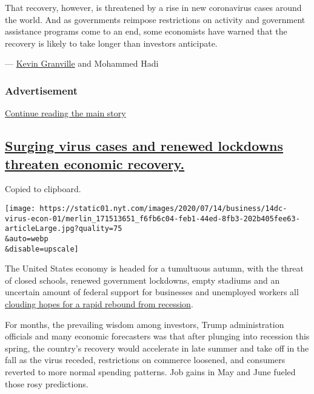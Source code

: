 That recovery, however, is threatened by a rise in new coronavirus cases
around the world. And as governments reimpose restrictions on activity
and government assistance programs come to an end, some economists have
warned that the recovery is likely to take longer than investors
anticipate.

--- \href{https://www.nytimes.com/by/kevin-granville}{Kevin Granville}
and Mohammed Hadi

\hypertarget{advertisement-2}{%
\subsubsection{Advertisement}\label{advertisement-2}}

\protect\hyperlink{after-dfp-ad-mid3}{Continue reading the main story}

\hypertarget{surging-virus-cases-and-renewed-lockdowns-threaten-economic-recovery}{%
\subsection{\texorpdfstring{\protect\hyperlink{surging-virus-cases-and-renewed-lockdowns-threaten-economic-recovery}{Surging
virus cases and renewed lockdowns threaten economic
recovery.}}{Surging virus cases and renewed lockdowns threaten economic recovery.}}\label{surging-virus-cases-and-renewed-lockdowns-threaten-economic-recovery}}

Copied to clipboard.

\texttt{[image: https://static01.nyt.com/images/2020/07/14/business/14dc-virus-econ-01/merlin\_171513651\_f6fb6c04-feb1-44ed-8fb3-202b405fee63-articleLarge.jpg?quality=75\\\&auto=webp\\\&disable=upscale]}

The United States economy is headed for a tumultuous autumn, with the
threat of closed schools, renewed government lockdowns, empty stadiums
and an uncertain amount of federal support for businesses and unemployed
workers all
\href{https://www.nytimes.com/2020/07/15/business/economy/economic-recovery-coronavirus-resurgence.html}{clouding
hopes for a rapid rebound from recession}.

For months, the prevailing wisdom among investors, Trump administration
officials and many economic forecasters was that after plunging into
recession this spring, the country's recovery would accelerate in late
summer and take off in the fall as the virus receded, restrictions on
commerce loosened, and consumers reverted to more normal spending
patterns. Job gains in May and June fueled those rosy predictions.

